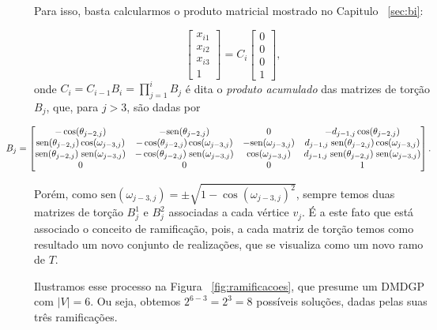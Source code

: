\documentclass[a4paper,12pt]{article}
\begin{document}
	Para isso, basta calcularmos o produto matricial mostrado no Capitulo ~\ref{sec:bi}:
	
	$$
	\begin{bmatrix}
	x_{i1}\\ 
	x_{i2}\\ 
	x_{i3}\\ 
	1
	\end{bmatrix}
	= C_{i}\begin{bmatrix}
	0\\ 
	0\\ 
	0\\ 
	1
	\end{bmatrix},
	$$
	onde $C_i = C_{i-1}B_i = \prod_{j=1}^{i}B_j$ é dita o \textit{produto acumulado} das matrizes de torção $B_j$, que, para $j>3$, são dadas por
	
	$$\hspace{-1.1cm}
	B_{j}=\begin{bmatrix}
	-\cos(\theta_{j-2,j}) & -\mbox{sen}(\theta_{j-2,j}) & 0 & -d_{j-1,j}\cos(\theta_{j-2,j}) \\
	\mbox{sen}(\theta_{j-2,j})\cos(\omega_{j-3,j}) & -\cos(\theta_{j-2,j})\cos(\omega_{j-3,j}) & -\mbox{sen}(\omega_{j-3,j}) & d_{j-1,j}\hspace{0.1cm}\mbox{sen}(\theta_{j-2,j})\cos(\omega_{j-3,j}) \\
	\mbox{sen}(\theta_{j-2,j})\hspace{0.1cm}\mbox{sen}(\omega_{j-3,j}) & -\cos(\theta_{j-2,j})\hspace{0.1cm}\mbox{sen}(\omega_{j-3,j}) & \cos(\omega_{j-3,j}) & d_{j-1,j}\hspace{0.1cm}\mbox{sen}(\theta_{j-2,j})\hspace{0.1cm}\mbox{sen}(\omega_{j-3,j}) \\
	0 & 0 & 0 & 1
	\end{bmatrix}.
	$$
	
	Porém, como $\mbox{sen}(\omega_{j-3,j}) = \pm\sqrt{1 - \cos(\omega_{j-3,j})^2}$, sempre temos duas matrizes de torção $B_j^1$ e $B_j^2$ associadas a cada vértice $v_j$. É a este fato que está associado o conceito de ramificação, pois, a cada matriz de torção temos como resultado um novo conjunto de realizações, que se visualiza como um novo ramo de $T$. 
	
	Ilustramos esse processo na Figura ~\ref{fig:ramificacoes}, que presume um DMDGP com $|V| = 6$. Ou seja, obtemos $2^{6-3} = 2^3 = 8$ possíveis soluções, dadas pelas suas três ramificações.
	
\end{document}
